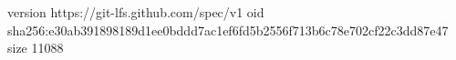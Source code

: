 version https://git-lfs.github.com/spec/v1
oid sha256:e30ab391898189d1ee0bddd7ac1ef6fd5b2556f713b6c78e702cf22c3dd87e47
size 11088
